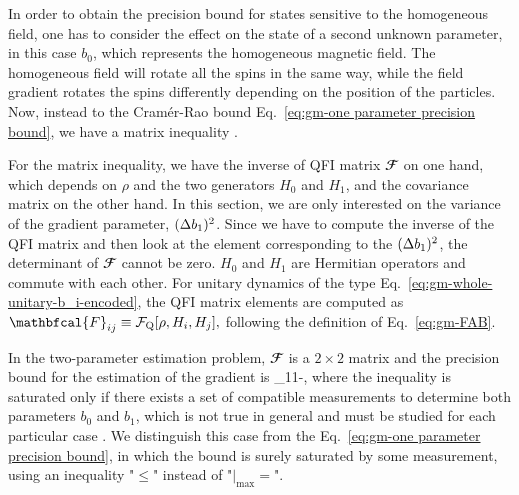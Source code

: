 In order to obtain the precision bound for states sensitive to the
homogeneous field, one has to consider the effect on the state of a second
unknown parameter, in this case $b_0$, which represents the homogeneous magnetic field.
The homogeneous field will rotate all the spins in the same way,
while the field gradient rotates the spins
differently depending on the position of the particles.
Now, instead to the Cram\'er-Rao bound Eq.~\eqref{eq:gm-one parameter precision bound},
we have a matrix inequality \cite{Paris2009}.

For the matrix inequality, we have the inverse of QFI matrix $\mathbfcal{F}$ on one hand, which depends on $\rho$ and the two generators $H_0$ and $H_1$, and the covariance matrix on the other hand.
In this section, we are only interested on the variance of the gradient parameter, $(\Delta b_1 )^2$.
Since we have to compute the inverse of the QFI matrix and then look at the element corresponding to the $(\Delta b_1 )^2$, the determinant of $\mathbfcal{F}$ cannot be zero.
$H_0$ and $H_1$ are Hermitian operators and commute with each other.
For unitary dynamics of the type Eq.~\eqref{eq:gm-whole-unitary-b_i-encoded}, the QFI matrix elements are computed as $\mathbfcal{F}_{ij}\equiv \qfif{\rho, H_i, H_j},$ following the definition of Eq.~\eqref{eq:gm-FAB}.

In the two-parameter estimation problem, $\mathbfcal{F}$ is a $2 \times 2$ matrix and the precision bound for the estimation of the gradient is
\be
\label{eq:gm-bound-for-b1-with-qfi-els}
  \leqslant {}_{11}-,
\ee
where the inequality is saturated only if there exists a set of compatible measurements to determine both parameters $b_0$ and $b_1$, which is not true in general and must be studied for each particular case \cite{Paris2009, Ragy2016}.
We distinguish this case from the Eq.~\eqref{eq:gm-one parameter precision bound}, in which the bound is surely saturated by some measurement, using an inequality "$\leqslant$" instead of "$|_{\max}=$".

